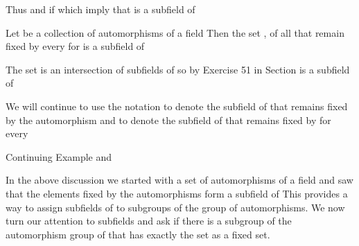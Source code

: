 \documentclass[11pt,oneside]{article}
\begin{document}
\begin{BookBody}
\noindent Thus  and if  which imply that  is a subfield of \BookEnd{\blacklozenge}

 Let  be a collection of automorphisms of a field  Then the set , of all  that remain fixed by every  for  is a subfield of 

 The set  is an intersection of subfields of  so by Exercise 51 in Section  is a subfield of \BookEnd{\blacklozenge}

We will continue to use the notation  to denote the subfield of  that remains fixed by the automorphism \BookInline{\sigma } and  to denote the subfield of  that remains fixed by  for every 

 Continuing Example  and  \BookEnd{\blacktriangle}

In the above discussion we started with a set of automorphisms of a field  and saw that the elements fixed by the automorphisms form a subfield of  This provides a way 
to assign subfields of  to subgroups of the group of automorphisms. We now turn our attention to subfields  and ask if there is a subgroup of the automorphism group of  that has exactly the set  as a fixed set.

\end{BookBody}

\BookNarrativetrue
\end{document}
